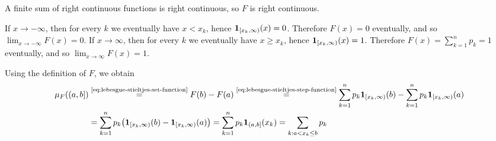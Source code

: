\begin{solution}
\begin{enumerate}[label={\protect\hyperref[exitem:lebesgue-stieltjes-step-function:\arabic*]{(\alph*)}}]
\begin{enumerate}[label={\protect\hyperref[exitem:lebesgue-stieltjes-step-function:\arabic{enumi}.\arabic*]{(\roman*)}}]
%
\tikzexternalenable%
A finite sum of right continuous functions is right continuous, so $F$ is right continuous.

\item \label{solitem:lebesgue-stieltjes-step-function:1.3}
If $x \to -\infty$, then for every $k$ we eventually have $x < x_k$, hence
\(\mathbf{1}_{[x_k,\infty)}(x)=0\).
Therefore $F(x)=0$ eventually, and so $\lim_{x\to -\infty} F(x)=0$.
If $x \to \infty$, then for every $k$ we eventually have $x \ge x_k$, hence
\(\mathbf{1}_{[x_k,\infty)}(x)=1\).
Therefore $F(x)=\sum_{k=1}^n p_k=1$ eventually, and so $\lim_{x\to \infty} F(x)=1$.
\end{enumerate}

\item \label{solitem:lebesgue-stieltjes-step-function:2}
\label{sol:lebesgue-stieltjes-step-function:explicit-mu-interval}
Using the definition of $F$, we obtain
\[
\begin{aligned}
\mu_F((a,b]) 
&\overset{\text{\eqref{eq:lebesgue-stieltjes-set-function}}}{=} 
F(b)-F(a)
\overset{\text{\eqref{eq:lebesgue-stieltjes-step-function}}}{=}
\sum_{k=1}^n p_k \mathbf{1}_{[x_k,\infty)}(b) - \sum_{k=1}^n p_k \mathbf{1}_{[x_k,\infty)}(a) \\
&=
\sum_{k=1}^n p_k\bigl(\mathbf{1}_{[x_k,\infty)}(b)-\mathbf{1}_{[x_k,\infty)}(a)\bigr)
=
\sum_{k=1}^n p_k \mathbf{1}_{(a,b]}(x_k)
=
\sum_{k: a < x_k \le b} p_k
\end{aligned}
\]


\end{enumerate}
\end{solution}
